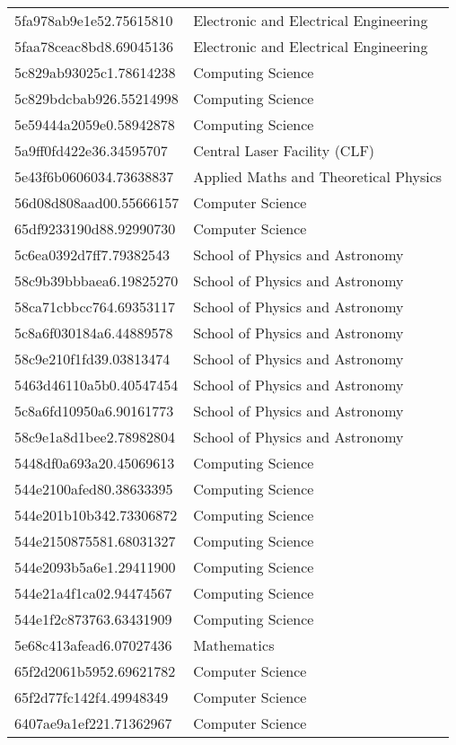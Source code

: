 \begin{tabular}{ll}
5fa978ab9e1e52.75615810 & Electronic and Electrical Engineering \\
5faa78ceac8bd8.69045136 & Electronic and Electrical Engineering \\
5c829ab93025c1.78614238 & Computing Science \\
5c829bdcbab926.55214998 & Computing Science \\
5e59444a2059e0.58942878 & Computing Science \\
5a9ff0fd422e36.34595707 & Central Laser Facility (CLF) \\
5e43f6b0606034.73638837 & Applied Maths and Theoretical Physics \\
56d08d808aad00.55666157 & Computer Science \\
65df9233190d88.92990730 & Computer Science \\
5c6ea0392d7ff7.79382543 & School of Physics and Astronomy \\
58c9b39bbbaea6.19825270 & School of Physics and Astronomy \\
58ca71cbbcc764.69353117 & School of Physics and Astronomy \\
5c8a6f030184a6.44889578 & School of Physics and Astronomy \\
58c9e210f1fd39.03813474 & School of Physics and Astronomy \\
5463d46110a5b0.40547454 & School of Physics and Astronomy \\
5c8a6fd10950a6.90161773 & School of Physics and Astronomy \\
58c9e1a8d1bee2.78982804 & School of Physics and Astronomy \\
5448df0a693a20.45069613 & Computing Science \\
544e2100afed80.38633395 & Computing Science \\
544e201b10b342.73306872 & Computing Science \\
544e2150875581.68031327 & Computing Science \\
544e2093b5a6e1.29411900 & Computing Science \\
544e21a4f1ca02.94474567 & Computing Science \\
544e1f2c873763.63431909 & Computing Science \\
5e68c413afead6.07027436 & Mathematics \\
65f2d2061b5952.69621782 & Computer Science \\
65f2d77fc142f4.49948349 & Computer Science \\
6407ae9a1ef221.71362967 & Computer Science \\

\end{tabular}
